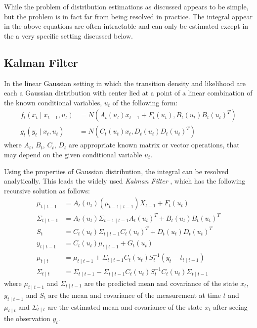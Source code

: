 While the problem of distribution estimations as discussed appears to be simple, but the problem is in fact far from being resolved in practice. The integral appear in the above equations are often intractable and can only be estimated except in the a very specific setting discussed below.

\subsection{Kalman Filter}
In the linear Gaussian setting in which the transition density and likelihood are each a Gaussian distribution with center lied at a point of a linear combination of the known conditional variables, $u_t$ of the following form:
\begin{align}
  f_t(x_t \mid x_{t-1}, u_t) &= N(A_t(u_t) x_{t-1} + F_t(u_t), B_t(u_t)B_t(u_t)^T) \nonumber \\
  g_t(y_t \mid x_t, u_t)    &= N(C_t(u_t) x_t, D_t(u_t)D_t(u_t)^T)
\end{align}
where $A_t$, $B_t$, $C_t$, $D_t$ are appropriate known matrix or vector operations, that may depend on the given conditional variable $u_t$.

Using the properties of Gaussian distribution, the integral can be resolved analytically. This leads the widely used \emph{Kalman Filter} \cite{KRE60}, which has the following recursive solution as follows:
\begin{align}
  \mu_{t \mid t -1} &= A_{t}(u_t)(\mu_{t-1 \mid t-1})X_{t-1} + F_t(u_t) \\
  \Sigma_{t \mid t -1} &= A_{t}(u_t)\Sigma_{t -1 \mid t -1}A_{t}(u_t)^T +  B_t(u_t)B_t(u_t)^T \\
  S_t &=  C_{t}(u_t)\Sigma_{t \mid t -1}C_{t}(u_t)^T +  D_t(u_t)D_t(u_t)^T \\
  y_{t \mid t-1} &=  C_{t}(u_t)  \mu_{t \mid t -1} + G_t(u_t) \\
  \mu_{t \mid t} &=   \mu_{t \mid t -1} +   \Sigma_{t \mid t -1} C_{t}(u_t)S_t^{-1}(y_t - t_{t \mid t-1}) \\
  \Sigma_{t \mid t} &=  \Sigma_{t \mid t -1} -\Sigma_{t \mid t -1} C_{t}(u_t)S_t^{-1} C_{t}(u_t)\Sigma_{t \mid t -1}
\end{align}
where  $\mu_{t \mid t -1}$ and $\Sigma_{t \mid t -1}$ are the predicted mean and covariance of the state $x_t$, $y_{t \mid t-1}$ and $S_t$ are the mean and covariance of the measurement at time $t$ and $\mu_{t \mid t}$ and $\Sigma_{t \mid t}$ are the estimated mean and covariance of the state $x_t$ after seeing the observation $y_t$.

